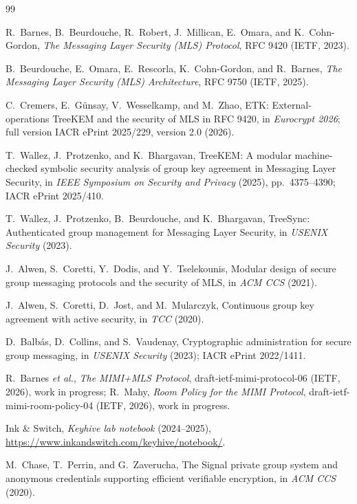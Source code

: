 \documentclass[aps,prx,reprint,superscriptaddress,nofootinbib,floatfix]{revtex4-2}
\theoremstyle{remark}
\begin{document}
\clearpage
\begin{thebibliography}{99}

 R.~Barnes, B.~Beurdouche, R.~Robert, J.~Millican, E.~Omara, and K.~Cohn-Gordon, \emph{The Messaging Layer Security (MLS) Protocol}, RFC 9420 (IETF, 2023).

 B.~Beurdouche, E.~Omara, E.~Rescorla, K.~Cohn-Gordon, and R.~Barnes, \emph{The Messaging Layer Security (MLS) Architecture}, RFC 9750 (IETF, 2025).

 C.~Cremers, E.~G\"unsay, V.~Wesselkamp, and M.~Zhao, ETK: External-operations TreeKEM and the security of MLS in RFC 9420, in \emph{Eurocrypt 2026}; full version IACR ePrint 2025/229, version 2.0 (2026).

 T.~Wallez, J.~Protzenko, and K.~Bhargavan, TreeKEM: A modular machine-checked symbolic security analysis of group key agreement in Messaging Layer Security, in \emph{IEEE Symposium on Security and Privacy} (2025), pp.~4375--4390; IACR ePrint 2025/410.

 T.~Wallez, J.~Protzenko, B.~Beurdouche, and K.~Bhargavan, TreeSync: Authenticated group management for Messaging Layer Security, in \emph{USENIX Security} (2023).

 J.~Alwen, S.~Coretti, Y.~Dodis, and Y.~Tselekounis, Modular design of secure group messaging protocols and the security of MLS, in \emph{ACM CCS} (2021).

 J.~Alwen, S.~Coretti, D.~Jost, and M.~Mularczyk, Continuous group key agreement with active security, in \emph{TCC} (2020).

 D.~Balb\'as, D.~Collins, and S.~Vaudenay, Cryptographic administration for secure group messaging, in \emph{USENIX Security} (2023); IACR ePrint 2022/1411.

 R.~Barnes \emph{et al.}, \emph{The MIMI+MLS Protocol}, draft-ietf-mimi-protocol-06 (IETF, 2026), work in progress; R.~Mahy, \emph{Room Policy for the MIMI Protocol}, draft-ietf-mimi-room-policy-04 (IETF, 2026), work in progress.

 Ink \& Switch, \emph{Keyhive lab notebook} (2024--2025), \url{https://www.inkandswitch.com/keyhive/notebook/}.

 M.~Chase, T.~Perrin, and G.~Zaverucha, The Signal private group system and anonymous credentials supporting efficient verifiable encryption, in \emph{ACM CCS} (2020).


\end{thebibliography}
\end{document}

